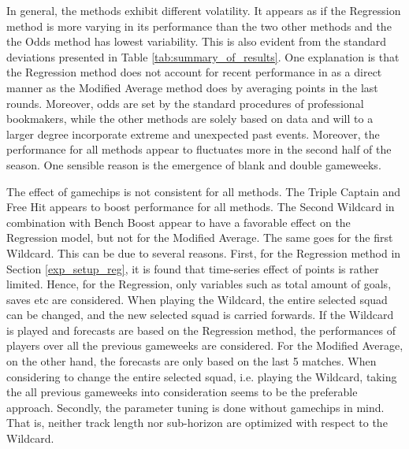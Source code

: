 \newpar 

In general, the methods exhibit different volatility. It appears as if the Regression method is more varying in its performance than the two other methods and the the Odds method has lowest variability. This is also evident from the standard deviations presented in Table \ref{tab:summary_of_results}. One explanation is that the Regression method does not account for recent performance in as a direct manner as the Modified Average method does by averaging points in the last rounds. Moreover, odds are set by the standard procedures of professional bookmakers, while the other methods are solely based on data and will to a larger degree incorporate extreme and unexpected past events. Moreover, the performance for all methods appear to fluctuates more in the second half of the season. One sensible reason is the emergence of blank and double gameweeks. 

\newpar

The effect of gamechips is not consistent for all methods. The Triple Captain and Free Hit appears to boost performance for all methods. The Second Wildcard in combination with Bench Boost appear to have a favorable effect on the Regression model, but not for the Modified Average. The same goes for the first Wildcard. This can be due to several reasons. First, for the Regression method in Section \ref{exp_setup_reg}, it is found that time-series effect of points is rather limited. Hence, for the Regression, only variables such as total amount of goals, saves etc are considered. When playing the Wildcard, the entire selected squad can be changed, and the new selected squad is carried forwards. If the Wildcard is played and forecasts are based on the Regression method, the performances of players over all the previous gameweeks are considered. For the Modified Average, on the other hand, the forecasts are only based on the last 5 matches. When considering to change the entire selected squad, i.e. playing the Wildcard, taking the all previous gameweeks into consideration seems to be the preferable approach. Secondly, the parameter tuning is done without gamechips in mind. That is, neither track length nor sub-horizon are optimized with respect to the Wildcard.

